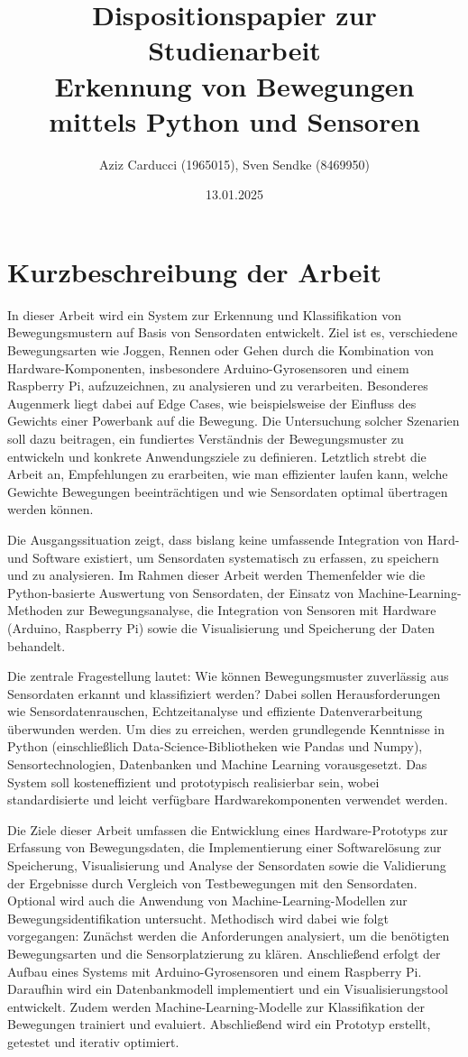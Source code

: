 \documentclass{scrartcl}
\title{Dispositionspapier zur Studienarbeit\\Erkennung von Bewegungen mittels Python und Sensoren}
\author{Aziz Carducci (1965015), Sven Sendke (8469950)}
\date{13.01.2025}
\begin{document}
\maketitle

\section{Kurzbeschreibung der Arbeit}
In dieser Arbeit wird ein System zur Erkennung und Klassifikation von Bewegungsmustern auf Basis von Sensordaten entwickelt. Ziel ist es, verschiedene Bewegungsarten wie Joggen, Rennen oder Gehen durch die Kombination von Hardware-Komponenten, insbesondere Arduino-Gyrosensoren und einem Raspberry Pi, aufzuzeichnen, zu analysieren und zu verarbeiten. Besonderes Augenmerk liegt dabei auf Edge Cases, wie beispielsweise der Einfluss des Gewichts einer Powerbank auf die Bewegung. Die Untersuchung solcher Szenarien soll dazu beitragen, ein fundiertes Verständnis der Bewegungsmuster zu entwickeln und konkrete Anwendungsziele zu definieren. Letztlich strebt die Arbeit an, Empfehlungen zu erarbeiten, wie man effizienter laufen kann, welche Gewichte Bewegungen beeinträchtigen und wie Sensordaten optimal übertragen werden können.

Die Ausgangssituation zeigt, dass bislang keine umfassende Integration von Hard- und Software existiert, um Sensordaten systematisch zu erfassen, zu speichern und zu analysieren. Im Rahmen dieser Arbeit werden Themenfelder wie die Python-basierte Auswertung von Sensordaten, der Einsatz von Machine-Learning-Methoden zur Bewegungsanalyse, die Integration von Sensoren mit Hardware (Arduino, Raspberry Pi) sowie die Visualisierung und Speicherung der Daten behandelt.

Die zentrale Fragestellung lautet: Wie können Bewegungsmuster zuverlässig aus Sensordaten erkannt und klassifiziert werden? Dabei sollen Herausforderungen wie Sensordatenrauschen, Echtzeitanalyse und effiziente Datenverarbeitung überwunden werden. Um dies zu erreichen, werden grundlegende Kenntnisse in Python (einschließlich Data-Science-Bibliotheken wie Pandas und Numpy), Sensortechnologien, Datenbanken und Machine Learning vorausgesetzt. Das System soll kosteneffizient und prototypisch realisierbar sein, wobei standardisierte und leicht verfügbare Hardwarekomponenten verwendet werden.

Die Ziele dieser Arbeit umfassen die Entwicklung eines Hardware-Prototyps zur Erfassung von Bewegungsdaten, die Implementierung einer Softwarelösung zur Speicherung, Visualisierung und Analyse der Sensordaten sowie die Validierung der Ergebnisse durch Vergleich von Testbewegungen mit den Sensordaten. Optional wird auch die Anwendung von Machine-Learning-Modellen zur Bewegungsidentifikation untersucht. Methodisch wird dabei wie folgt vorgegangen: Zunächst werden die Anforderungen analysiert, um die benötigten Bewegungsarten und die Sensorplatzierung zu klären. Anschließend erfolgt der Aufbau eines Systems mit Arduino-Gyrosensoren und einem Raspberry Pi. Daraufhin wird ein Datenbankmodell implementiert und ein Visualisierungstool entwickelt. Zudem werden Machine-Learning-Modelle zur Klassifikation der Bewegungen trainiert und evaluiert. Abschließend wird ein Prototyp erstellt, getestet und iterativ optimiert.
\end{document}

